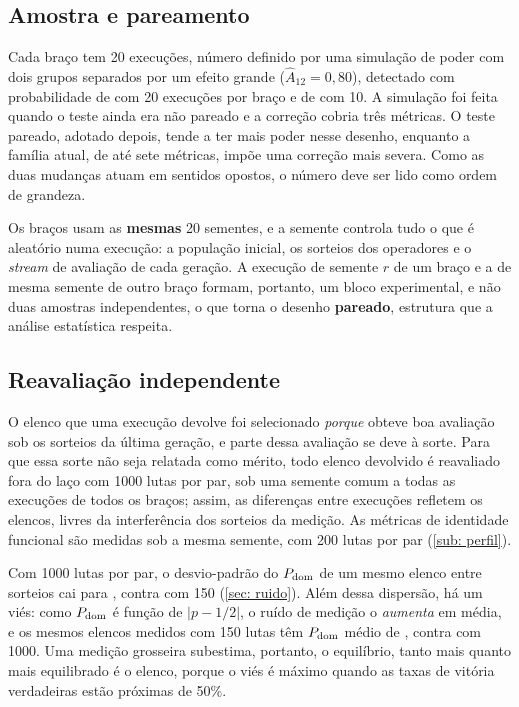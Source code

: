 \subsection{Amostra e pareamento}
\label{sub: amostra}

Cada braço tem 20 execuções, número definido por uma simulação de poder com dois grupos separados por um efeito grande ($\hat{A}_{12} = 0{,}80$), detectado com probabilidade de \poderNVinte{} com 20 execuções por braço e de \poderNDez{} com 10. A simulação foi feita quando o teste ainda era não pareado e a correção cobria três métricas. O teste pareado, adotado depois, tende a ter mais poder nesse desenho, enquanto a família atual, de até sete métricas, impõe uma correção mais severa. Como as duas mudanças atuam em sentidos opostos, o número deve ser lido como ordem de grandeza.

Os braços usam as \textbf{mesmas} 20 sementes, e a semente controla tudo o que é aleatório numa execução: a população inicial, os sorteios dos operadores e o \textit{stream} de avaliação de cada geração. A execução de semente $r$ de um braço e a de mesma semente de outro braço formam, portanto, um bloco experimental, e não duas amostras independentes, o que torna o desenho \textbf{pareado}, estrutura que a análise estatística respeita.

\subsection{Reavaliação independente}
\label{sub: reavaliacao}

O elenco que uma execução devolve foi selecionado \textit{porque} obteve boa avaliação sob os sorteios da última geração, e parte dessa avaliação se deve à sorte. Para que essa sorte não seja relatada como mérito, todo elenco devolvido é reavaliado fora do laço com 1000 lutas por par, sob uma semente comum a todas as execuções de todos os braços; assim, as diferenças entre execuções refletem os elencos, livres da interferência dos sorteios da medição. As métricas de identidade funcional são medidas sob a mesma semente, com 200 lutas por par (\autoref{sub: perfil}).

Com 1000 lutas por par, o desvio-padrão do $P_{\mathrm{dom}}$ de um mesmo elenco entre sorteios cai para \ruidoDomDpMil{}, contra \ruidoDomDpTreino{} com 150 (\autoref{sec: ruido}). Além dessa dispersão, há um viés: como $P_{\mathrm{dom}}$ é função de $|p - 1/2|$, o ruído de medição o \textit{aumenta} em média, e os mesmos elencos medidos com 150 lutas têm $P_{\mathrm{dom}}$ médio de \ruidoDomMediaTreino{}, contra \ruidoDomMediaMil{} com 1000. Uma medição grosseira subestima, portanto, o equilíbrio, tanto mais quanto mais equilibrado é o elenco, porque o viés é máximo quando as taxas de vitória verdadeiras estão próximas de 50\%.


